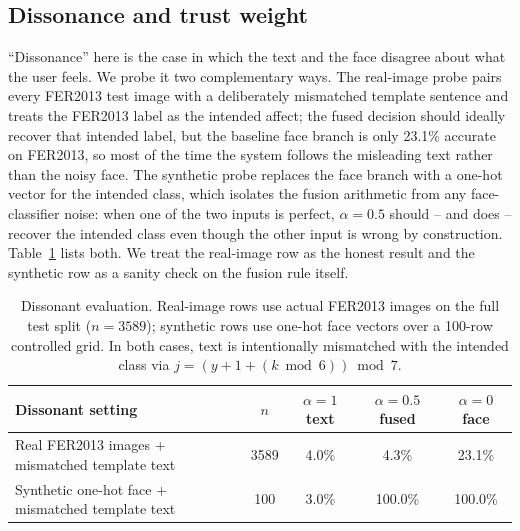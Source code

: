 \documentclass[sigconf,nonacm]{acmart}
\begin{document}
  \subsection{Dissonance and trust weight}\label{sec:dissonance}
  ``Dissonance'' here is the case in which the text and the face disagree about what the user feels. We probe it two complementary ways. The real-image probe pairs every FER2013 test image with a deliberately mismatched template sentence and treats the FER2013 label as the intended affect; the fused decision should ideally recover that intended label, but the baseline face branch is only 23.1\% accurate on FER2013, so most of the time the system follows the misleading text rather than the noisy face. The synthetic probe replaces the face branch with a one-hot vector for the intended class, which isolates the fusion arithmetic from any face-classifier noise: when one of the two inputs is perfect, $\alpha\!=\!0.5$ should -- and does -- recover the intended class even though the other input is wrong by construction. Table~\ref{tab:dissonance} lists both. We treat the real-image row as the honest result and the synthetic row as a sanity check on the fusion rule itself.

  \begin{table}[t]
    \centering
    \small
    \caption{Dissonant evaluation. Real-image rows use actual FER2013 images on the full test split ($n\!=\!3589$); synthetic rows use one-hot face vectors over a 100-row controlled grid. In both cases, text is intentionally mismatched with the intended class via $j\!=\!(y\!+\!1\!+\!(k\bmod 6))\bmod 7$.}
    \label{tab:dissonance}
    \begin{tabular}{@{}lcccc@{}}
      \toprule
      \textbf{Dissonant setting} & \textbf{$n$} & \textbf{$\alpha=1$ text} & \textbf{$\alpha=0.5$ fused} & \textbf{$\alpha=0$ face} \\
      \midrule
      Real FER2013 images + mismatched template text   & 3589 & 4.0\%  & 4.3\%   & 23.1\% \\
      Synthetic one-hot face + mismatched template text & 100  & 3.0\%  & 100.0\% & 100.0\% \\
      \bottomrule
    \end{tabular}
  \end{table}
\end{document}
